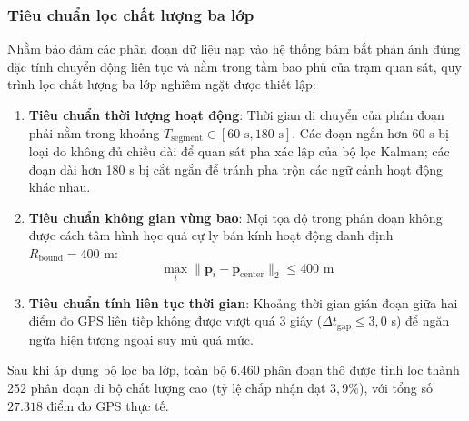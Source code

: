 \subsubsection{Tiêu chuẩn lọc chất lượng ba lớp}

\hspace{0.5cm} Nhằm bảo đảm các phân đoạn dữ liệu nạp vào hệ thống bám bắt phản ánh đúng đặc tính chuyển động liên tục và nằm trong tầm bao phủ của trạm quan sát, quy trình lọc chất lượng ba lớp nghiêm ngặt được thiết lập:
\begin{enumerate}
    \item \textbf{Tiêu chuẩn thời lượng hoạt động}: Thời gian di chuyển của phân đoạn phải nằm trong khoảng $T_{\text{segment}} \in [60\text{ s}, 180\text{ s}]$. Các đoạn ngắn hơn 60 s bị loại do không đủ chiều dài để quan sát pha xác lập của bộ lọc Kalman; các đoạn dài hơn 180 s bị cắt ngắn để tránh pha trộn các ngữ cảnh hoạt động khác nhau.
    \item \textbf{Tiêu chuẩn không gian vùng bao}: Mọi tọa độ trong phân đoạn không được cách tâm hình học quá cự ly bán kính hoạt động danh định $R_{\text{bound}} = 400$ m:
    \begin{equation}
    \max_{i} \|\mathbf{p}_i - \mathbf{p}_{\text{center}}\|_2 \le 400 \text{ m}
    \label{eq:geolife-spatial-bound}
    \end{equation}
    \item \textbf{Tiêu chuẩn tính liên tục thời gian}: Khoảng thời gian gián đoạn giữa hai điểm đo GPS liên tiếp không được vượt quá 3 giây ($\Delta t_{\text{gap}} \le 3{,}0$ s) để ngăn ngừa hiện tượng ngoại suy mù quá mức.
\end{enumerate}

Sau khi áp dụng bộ lọc ba lớp, toàn bộ 6.460 phân đoạn thô được tinh lọc thành 252 phân đoạn đi bộ chất lượng cao (tỷ lệ chấp nhận đạt $3{,}9\%$), với tổng số $27.318$ điểm đo GPS thực tế.

\begin{table}[H]
\centering
\caption{Thống kê định lượng 252 phân đoạn người đi bộ Geolife sau khi chuẩn hóa}
\label{tab:geolife-clean-stats}
\end{table}

